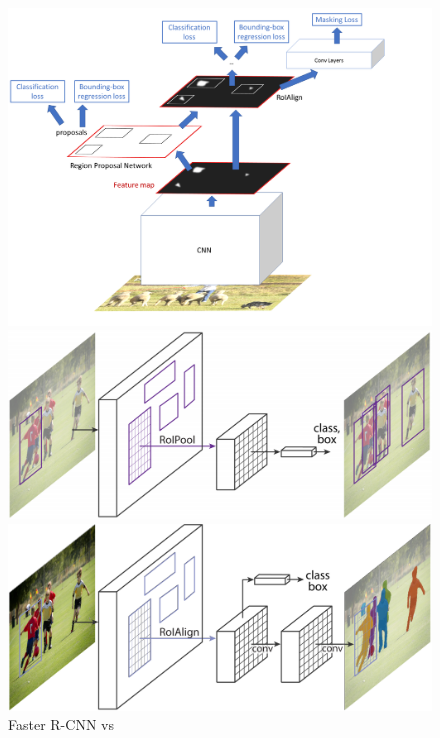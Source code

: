 \begin{figure}[H]
	\centering
	\includegraphics[scale=0.36]{images/masknetwork.png}

	\includegraphics[scale=0.45]{images/fasterrcnnvs.PNG}

	\includegraphics[scale=0.45]{images/maskrcnn.PNG}

	\caption{Faster R-CNN vs \maskrcnn}
	\label{f:fastermaskrcnn}
\end{figure}

